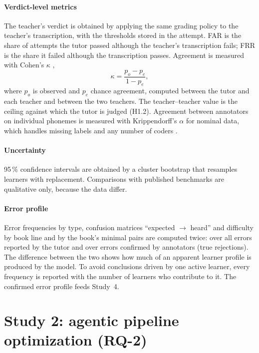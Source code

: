 \paragraph{Verdict-level metrics} The teacher's verdict is obtained by applying the same grading policy to
the teacher's transcription, with the thresholds stored in the attempt. FAR is the share of attempts the
tutor passed although the teacher's transcription fails; FRR is the share it failed although the
transcription passes. Agreement is measured with Cohen's $\kappa$ \cite{SRC-104},
\begin{equation}
  \kappa = \frac{p_o - p_e}{1 - p_e},
\end{equation}
where $p_o$ is observed and $p_e$ chance agreement, computed between the tutor and each teacher and between
the two teachers. The teacher--teacher value is the ceiling against which the tutor is judged (H1.2).
Agreement between annotators on individual phonemes is measured with Krippendorff's $\alpha$ for nominal
data, which handles missing labels and any number of coders \cite{SRC-065}.

\paragraph{Uncertainty} 95\,\% confidence intervals are obtained by a cluster bootstrap that resamples
learners with replacement. Comparisons with published benchmarks are qualitative only, because the data
differ.

\paragraph{Error profile} Error frequencies by type, confusion matrices ``expected $\to$ heard'' and
difficulty by book line and by the book's minimal pairs are computed twice: over all errors reported by the
tutor and over errors confirmed by annotators (true rejections). The difference between the two shows how
much of an apparent learner profile is produced by the model. To avoid conclusions driven by one active
learner, every frequency is reported with the number of learners who contribute to it. The confirmed error
profile feeds Study~4.

\section{Study 2: agentic pipeline optimization (RQ-2)}\label{sec:method-s2}

